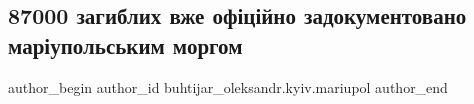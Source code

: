 
 
 
 
 

\subsection{87000 загиблих вже офіційно задокументовано маріупольським моргом}
\label{sec:29_08_2022.fb.buhtijar_oleksandr.kyiv.mariupol.1.87000_zagiblikh_vzhe}

\ifcmt
 author_begin
   author_id buhtijar_oleksandr.kyiv.mariupol
 author_end
\fi
